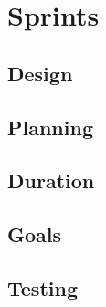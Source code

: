 \chapter{Sprints}
\section{Design}
\section{Planning}
\section{Duration}
\section{Goals}
\section{Testing}


